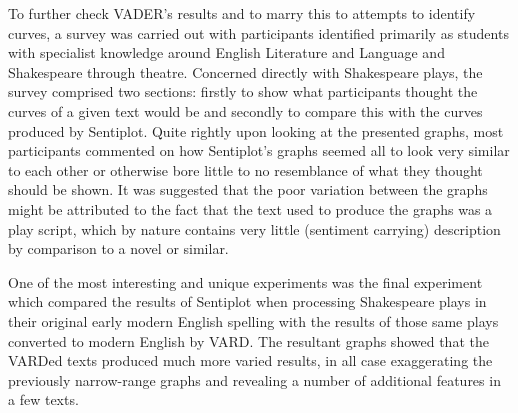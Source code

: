 \documentclass{article}
\begin{document}
    To further check VADER's results and to marry this to attempts to identify curves, a survey was carried out with participants identified primarily as students with specialist knowledge around English Literature and Language and Shakespeare through theatre. Concerned directly with Shakespeare plays, the survey comprised two sections: firstly to show what participants thought the curves of a given text would be and secondly to compare this with the curves produced by Sentiplot. Quite rightly upon looking at the presented graphs, most participants commented on how Sentiplot's graphs seemed all to look very similar to each other or otherwise bore little to no resemblance of what they thought should be shown. It was suggested that the poor variation between the graphs might be attributed to the fact that the text used to produce the graphs was a play script, which by nature contains very little (sentiment carrying) description by comparison to a novel or similar.

    One of the most interesting and unique experiments was the final experiment which compared the results of Sentiplot when processing Shakespeare plays in their original early modern English spelling with the results of those same plays converted to modern English by VARD. The resultant graphs showed that the VARDed texts produced much more varied results, in all case exaggerating the previously narrow-range graphs and revealing a number of additional features in a few texts.
\end{document}
